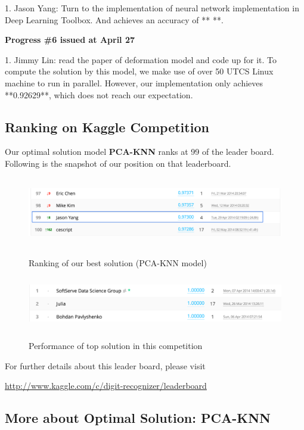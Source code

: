 \documentclass{article} %
\begin{document}
1. Jason Yang: Turn to the implementation of neural network implementation in
Deep Learning Toolbox. And achieves an accuracy of ** **.

{\bf Progress \#6 issued at April 27 }

1. Jimmy Lin: read the paper of deformation model and code up for it. To
compute the solution by this model, we make use of over 50 UTCS Linux machine
to run in parallel. However, our implementation only achieves **0.92629**,
which does not reach our expectation.

\subsection{Ranking on Kaggle Competition}

Our optimal solution model {\bf PCA-KNN} ranks at 99 of the leader board.
Following is the snapshot of our position on that leaderboard.

\begin{figure}[h]
    \centering
    \includegraphics[width=5.5in,height=1.2in]{./images/Rank.png} \\
    \caption{Ranking of our best solution (PCA-KNN model)}
\end{figure}

\begin{figure}[h]
    \centering
    \includegraphics[width=5.5in,height=0.9in]{./images/topRank.png} \\
    \caption{Performance of top solution in this competition}
\end{figure}
For further details about this leader board, please visit
\begin{center}
\url{http://www.kaggle.com/c/digit-recognizer/leaderboard} 
\end{center}

\subsection{More about Optimal Solution: PCA-KNN}
\end{document}
